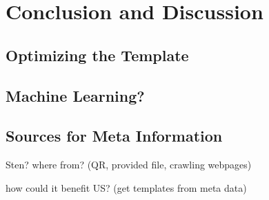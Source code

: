 %
\section{Conclusion and Discussion}
\label{sec_conclusion}

\subsection{Optimizing the Template}
\subsection{Machine Learning?}
\subsection{Sources for Meta Information}
Sten?
where from? (QR, provided file, crawling webpages)

how could it benefit US? (get templates from meta data)

